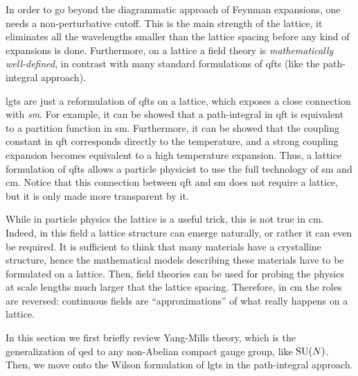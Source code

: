 In order to go beyond the diagrammatic approach of Feynman expansions, one needs a non-perturbative cutoff.
This is the main strength of the lattice, it eliminates all the wavelengths smaller than the lattice spacing before any kind of expansions is done.
Furthermore, on a lattice a field theory is \emph{mathematically well-defined}, in contrast with many standard formulations of \ac{qft}s (like the path-integral approach).

\Acp{lgt} are just a reformulation of \acp{qft} on a lattice, which exposes a close connection with \emph{\ac{sm}}.
For example, it can be showed that a path-integral in \ac{qft} is equivalent to a partition function in \ac{sm}.
Furthermore, it can be showed that the coupling constant in \ac{qft} corresponds directly to the temperature, and a strong coupling expansion becomes equivalent to a high temperature expansion.
Thus, a lattice formulation of \ac{qft}s allows a particle physicist to use the full technology of \ac{sm} and \acf{cm}.
Notice that this connection between \ac{qft} and \ac{sm} does not require a lattice, but it is only made more transparent by it.

While in particle physics the lattice is a useful trick, this is not true in \ac{cm}.
Indeed, in this field a lattice structure can emerge naturally, or rather it can even be required.
It is sufficient to think that many materials have a crystalline structure, hence the mathematical models describing these materials have to be formulated on a lattice.
Then, field theories can be used for probing the physics at scale lengths much larger that the lattice spacing.
Therefore, in \ac{cm} the roles are reversed: continuous fields are ``approximations'' of what really happens on a lattice.


\bigskip

In this section we first briefly review Yang-Mills theory, which is the generalization of \ac{qed} to any non-Abelian compact gauge group, like $\text{SU}(N)$.
Then, we move onto the Wilson formulation of \acp{lgt} in the path-integral approach.




